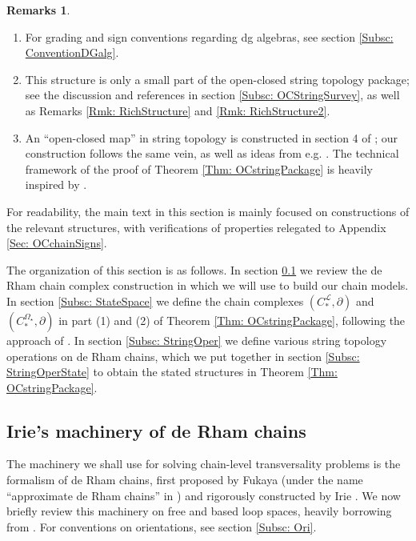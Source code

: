 \documentclass[10pt]{amsart}
\numberwithin{equation}{section}
\theoremstyle{plain}
\theoremstyle{definition}
\newtheorem{remarks}[theorem]{Remarks}
\theoremstyle{remark}
\numberwithin{equation}{section}
\newcommand{\CFr}{C_*^\mathscr{L}}
\newcommand{\CBa}{C_*^{\Omega_\star}}
\begin{document}
{\begin{remarks}
	\begin{enumerate}
		\item For grading and sign conventions regarding dg algebras, see section \ref{Subsc: ConventionDGalg}.
		\item This structure is only a small part of the open-closed string topology package; see the discussion and references in section \ref{Subsc: OCStringSurvey}, as well as Remarks \ref{Rmk: RichStructure} and \ref{Rmk: RichStructure2}.
		\item An ``open-closed map'' in string topology is constructed in section 4 of \cite{AbouzaidCotangent}; our construction follows the same vein, as well as ideas from e.g. \cite{AbouzaidLect}. The technical framework of the proof of Theorem \ref{Thm: OCstringPackage} is heavily inspired by \cite{Irie2,WangThesis}.
	\end{enumerate}
\end{remarks}


For readability, the main text in this section is mainly focused on constructions of the relevant structures, with verifications of properties relegated to Appendix \ref{Sec: OCchainSigns}.



The organization of this section is as follows. In section \ref{Subsc: dR Chain}  we review the de Rham chain complex construction in \cite{Irie1} which we will use to build our chain models. In section \ref{Subsc: StateSpace} we define the chain complexes $(\CFr,\partial)$ and $(\CBa,\partial)$ in part (1) and (2) of Theorem \ref{Thm: OCstringPackage}, following the approach of \cite{WangThesis}. In section \ref{Subsc: StringOper} we define various string topology operations on de Rham chains, which we put together in section \ref{Subsc: StringOperState} to obtain the stated structures in Theorem \ref{Thm: OCstringPackage}.



\subsection{Irie's machinery of de Rham chains}\label{Subsc: dR Chain}
The machinery we shall use for solving chain-level transversality problems is the formalism of de Rham chains, first proposed by Fukaya (under the name ``approximate de Rham chains'' in \cite{FukayaLagrangian} ) and rigorously constructed by Irie \cite{Irie1,Irie2}. 
We now briefly review this machinery on free and based loop spaces,  heavily borrowing from \cite{Irie1}.
For conventions on orientations, see section \ref{Subsc: Ori}.


}
\end{document}
